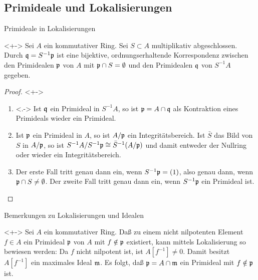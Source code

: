 \subsection{Primideale und Lokalisierungen}

\begin{frame}{Primideale in Lokalisierungen}
	\begin{proposition}<+->
		Sei \(A\) ein kommutativer Ring. Sei \(S \subset A\) multiplikativ abgeschlossen.
		Durch \(\mathfrak{q} = S^{-1} \mathfrak{p}\) ist eine bijektive,
		ordnungserhaltende Korrespondenz zwischen den Primidealen
		\(\mathfrak{p}\) von \(A\) mit \(\mathfrak{p} \cap S = \emptyset\) und den Primidealen \(\mathfrak{q}\) von \(S^{-1} A\) gegeben.
	\end{proposition}
	\begin{proof}<+->
		\begin{enumerate}[<+->]
		\item<.->
			Ist \(\mathfrak{q}\) ein Primideal in \(S^{-1} A\), so ist \(\mathfrak{p} = A \cap \mathfrak{q}\) als Kontraktion eines
			Primideals wieder ein Primideal.
		\item
			Ist \(\mathfrak{p}\) ein Primideal in \(A\), so ist \(A/\mathfrak{p}\) ein Integritätsbereich. Ist \(\bar S\) das Bild von
			\(S\) in \(A/\mathfrak{p}\), so ist \(S^{-1} A/S^{-1} \mathfrak{p} \cong \bar S^{-1}(A/\mathfrak{p})\) und damit entweder der Nullring
			oder wieder ein Integritätsbereich.
		\item
			Der erste Fall tritt genau dann ein, wenn \(S^{-1} \mathfrak{p} = (1)\), also genau dann, wenn
			\(\mathfrak{p} \cap S \neq \emptyset\).
			Der zweite Fall tritt genau dann ein, wenn \(S^{-1} \mathfrak{p}\) ein Primideal ist.
			\qedhere
		\end{enumerate}
	\end{proof}
\end{frame}

\begin{frame}{Bemerkungen zu Lokalisierungen und Idealen}
	\begin{remark}<+->
		Sei \(A\) ein kommutativer Ring. Daß zu einem nicht nilpotenten Element \(f \in A\) ein Primideal \(\mathfrak{p}\) von
		\(A\) mit \(f \notin \mathfrak{p}\) existiert, kann mittels Lokalisierung so bewiesen werden: Da \(f\) nicht nilpotent
		ist, ist \(A[f^{-1}] \neq 0\). Damit besitzt \(A[f^{-1}]\) ein maximales Ideal \(\mathfrak{m}\). Es folgt, daß
		\(\mathfrak{p} = A \cap \mathfrak{m}\) ein Primideal mit \(f \notin \mathfrak{p}\) ist.
	\end{remark}
\end{frame}

